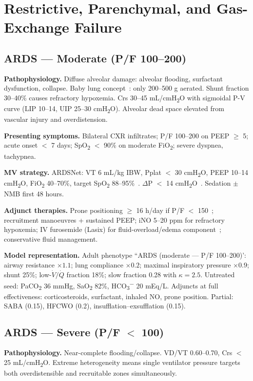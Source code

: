 \section{Restrictive, Parenchymal, and Gas-Exchange Failure}
\subsection{ARDS --- Moderate (P/F 100--200)}
\textbf{Pathophysiology.} Diffuse alveolar damage: alveolar flooding, surfactant dysfunction, collapse. Baby lung concept~\citep{gattinoni2005a}: only 200--500 g aerated. Shunt fraction 30--40\% causes refractory hypoxemia. Crs 30--45 mL/cmH\textsubscript{2}O with sigmoidal P-V curve (LIP 10--14, UIP 25--30 cmH\textsubscript{2}O). Alveolar dead space elevated from vascular injury and overdistension.

\textbf{Presenting symptoms.} Bilateral CXR infiltrates; P/F 100--200 on PEEP $\geq$ 5; acute onset $<$ 7 days; SpO\textsubscript{2} $<$ 90\% on moderate FiO\textsubscript{2}; severe dyspnea, tachypnea.

\textbf{MV strategy.} ARDSNet: VT 6 mL/kg IBW, Pplat $<$ 30 cmH\textsubscript{2}O, PEEP 10--14 cmH\textsubscript{2}O, FiO\textsubscript{2} 40--70\%, target SpO\textsubscript{2} 88--95\%~\citep{ards2000}. $\Delta$P $<$ 14 cmH\textsubscript{2}O~\citep{amato2015}. Sedation $\pm$ NMB first 48 hours.

\textbf{Adjunct therapies.} Prone positioning $\geq$ 16 h/day if P/F $<$ 150~\citep{guerin2013a}; recruitment manoeuvres + sustained PEEP; iNO 5--20 ppm for refractory hypoxemia; IV furosemide (Lasix) for fluid-overload/edema component~\citep{marini1992,lemaire1988}; conservative fluid management.

\textbf{Model representation.} Adult phenotype ``ARDS (moderate --- P/F 100--200)': airway resistance $\times1.1$; lung compliance $\times0.2$; maximal inspiratory pressure $\times0.9$; shunt 25\%; low-$\dot V/\dot Q$ fraction 18\%; slow fraction 0.28 with $\kappa=2.5$. Untreated seed: PaCO\textsubscript{2} 36 mmHg, SaO\textsubscript{2} 82\%, HCO\textsubscript{3}\textsuperscript{$-$} 20 mEq/L. Adjuncts at full effectiveness: corticosteroids, surfactant, inhaled NO, prone position. Partial: SABA (0.15), HFCWO (0.2), insufflation--exsufflation (0.15).

\subsection{ARDS --- Severe (P/F $<$ 100)}
\textbf{Pathophysiology.} Near-complete flooding/collapse. VD/VT 0.60--0.70, Crs $<$ 25 mL/cmH\textsubscript{2}O. Extreme heterogeneity means single ventilator pressure targets both overdistensible and recruitable zones simultaneously.

